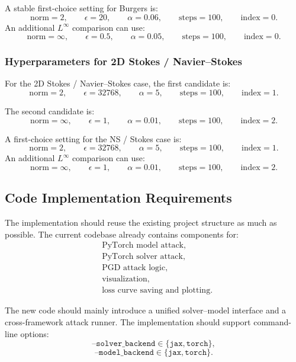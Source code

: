 \documentclass{article}
\begin{document}
A stable first-choice setting for Burgers is:
\[
\boxed{
\text{norm}=2,
\qquad
\epsilon=20,
\qquad
\alpha=0.06,
\qquad
\text{steps}=100,
\qquad
\text{index}=0.
}
\]
An additional \(L^{\infty}\) comparison can use:
\[
\boxed{
\text{norm}=\infty,
\qquad
\epsilon=0.5,
\qquad
\alpha=0.05,
\qquad
\text{steps}=100,
\qquad
\text{index}=0.
}
\]

\subsubsection{Hyperparameters for 2D Stokes / Navier--Stokes}

For the 2D Stokes / Navier--Stokes case, the first candidate is:
\[
\text{norm}=2,
\qquad
\epsilon=32768,
\qquad
\alpha=5,
\qquad
\text{steps}=100,
\qquad
\text{index}=1.
\]

The second candidate is:
\[
\text{norm}=\infty,
\qquad
\epsilon=1,
\qquad
\alpha=0.01,
\qquad
\text{steps}=100,
\qquad
\text{index}=2.
\]

A first-choice setting for the NS / Stokes case is:
\[
\boxed{
\text{norm}=2,
\qquad
\epsilon=32768,
\qquad
\alpha=5,
\qquad
\text{steps}=100,
\qquad
\text{index}=1.
}
\]
An additional \(L^{\infty}\) comparison can use:
\[
\boxed{
\text{norm}=\infty,
\qquad
\epsilon=1,
\qquad
\alpha=0.01,
\qquad
\text{steps}=100,
\qquad
\text{index}=2.
}
\]

\subsection{Code Implementation Requirements}

The implementation should reuse the existing project structure as much as possible. The current codebase already contains components for:
\[
\begin{aligned}
&\text{PyTorch model attack},\\
&\text{PyTorch solver attack},\\
&\text{PGD attack logic},\\
&\text{visualization},\\
&\text{loss curve saving and plotting}.
\end{aligned}
\]

The new code should mainly introduce a unified solver--model interface and a cross-framework attack runner. The implementation should support command-line options:
\[
\texttt{--solver\_backend} \in \{\texttt{jax},\texttt{torch}\},
\]
\[
\texttt{--model\_backend} \in \{\texttt{jax},\texttt{torch}\}.
\]
\end{document}
